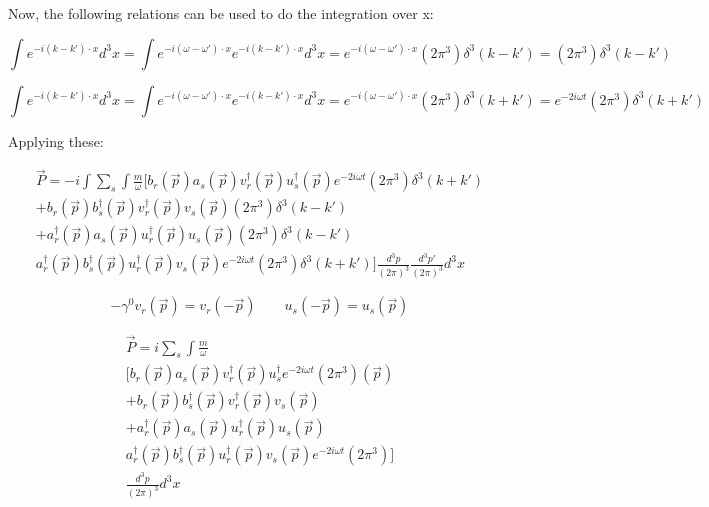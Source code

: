 \documentclass[a4]{article}
\begin{document}
    Now, the following relations can be used to do the integration over x:

    \begin{equation}
        \int e^{-i (k-k') \cdot x} d^3 x = \int e^{-i (\omega-\omega') \cdot x} e^{-i (k-k') \cdot x} d^3 x = e^{-i (\omega-\omega') \cdot x} (2 \pi^3) \delta^3 (k - k') = (2 \pi^3) \delta^3 (k - k')
    \end{equation}

    \begin{equation}
        \int e^{-i (k-k') \cdot x} d^3 x = \int e^{-i (\omega-\omega') \cdot x} e^{-i (k-k') \cdot x} d^3 x = e^{-i (\omega-\omega') \cdot x} (2 \pi^3) \delta^3 (k + k') = e^{-2i \omega t} (2 \pi^3) \delta^3 (k + k')
    \end{equation}

    Applying these:

    \begin{equation}
        \begin{aligned}
            \vec{P} = - i \int \sum_{s} \int \frac{m}{\omega} [b_r (\vec{p}) a_s (\vec{p}) v_r^{\dagger} (\vec{p}) u_s^{\dagger} (\vec{p}) e^{-2i \omega t} (2 \pi^3) \delta^3 (k + k') \\
            + b_r (\vec{p}) b_s^{\dagger} (\vec{p}) v_r^{\dagger} (\vec{p}) v_s (\vec{p}) (2 \pi^3) \delta^3 (k - k') \\
            + a_r^{\dagger} (\vec{p}) a_s (\vec{p}) u_r^{\dagger} (\vec{p}) u_s (\vec{p}) (2 \pi^3) \delta^3 (k - k') \\
            a_r^{\dagger} (\vec{p}) b_s^{\dagger} (\vec{p}) u_r^{\dagger} (\vec{p}) v_s (\vec{p}) e^{-2i \omega t} (2 \pi^3) \delta^3 (k + k')] \frac{d^{3} p}{(2 \pi)^3} \frac{d^{3} p'}{(2 \pi)^3} d^3 x
        \end{aligned}
    \end{equation}

    \begin{equation}
        - \gamma^0 v_r (\vec{p}) = v_r (- \vec{p}) \qquad u_s (- \vec{p}) = u_s (\vec{p})
    \end{equation}

    \begin{equation}
        \begin{aligned}
            \vec{P} = i \sum_{s} \int \frac{m}{\omega} \\
        [b_r (\vec{p}) a_s (\vec{p}) v_r^{\dagger} (\vec{p}) u_s^{\dagger} e^{-2i \omega t} (2 \pi^3) (\vec{p}) \\
        + b_r (\vec{p}) b_s^{\dagger} (\vec{p}) v_r^{\dagger} (\vec{p}) v_s (\vec{p}) \\
        + a_r^{\dagger} (\vec{p}) a_s (\vec{p}) u_r^{\dagger} (\vec{p}) u_s (\vec{p}) \\
        a_r^{\dagger} (\vec{p}) b_s^{\dagger} (\vec{p}) u_r^{\dagger} (\vec{p}) v_s (\vec{p}) e^{-2i \omega t} (2 \pi^3)] \\
        \frac{d^{3} p}{(2 \pi)^3} d^3 x
        \end{aligned}
    \end{equation}
\end{document}
